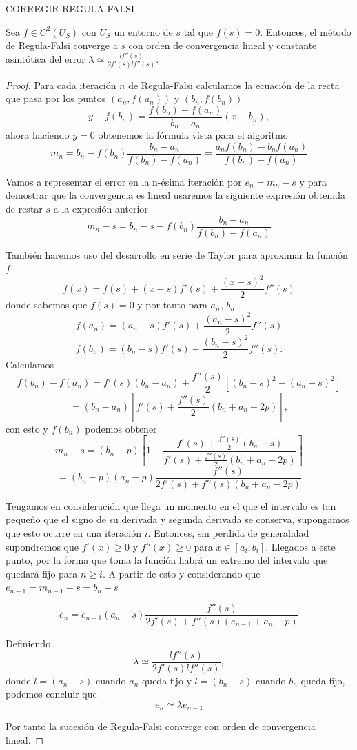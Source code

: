 CORREGIR REGULA-FALSI
\begin{teorema}
	Sea $f \in C^2(U_S)$ con $U_S$ un entorno de $s$ tal que $f(s) = 0$. Entonces, el método de Regula-Falsi converge a $s$ con orden de convergencia lineal y constante asintótica del error $\lambda \simeq \frac{l f''(s)}{2 f'(s) l f''(s)}$.
	
\end{teorema}

\begin{proof}
	Para cada iteración $n$ de Regula-Falsi calculamos la ecuación de la recta que pasa por los puntos $(a_n, f(a_n))$ y $(b_n, f(b_n))$
	\[
		y - f(b_n) = \frac{f(b_n) - f(a_n)}{b_n - a_n}(x - b_n),
	\]
	ahora haciendo $y = 0$ obtenemos la fórmula vista para el algoritmo
	\[
		m_n = b_n - f(b_n) \frac{b_n - a_n}{f(b_n) - f(a_n)} = \frac{a_n f(b_n) - b_n f(a_n)}{f(b_n) - f(a_n)}
	\]
	
	Vamos a representar el error en la n-ésima iteración por $e_n = m_n - s$ y para demostrar que la convergencia es lineal usaremos la siguiente expresión obtenida de restar $s$ a la expresión anterior
	\[
		m_n - s = b_n - s - f(b_n) \frac{b_n - a_n}{f(b_n) - f(a_n)}
	\]
	
	También haremos uso del desarrollo en serie de Taylor para aproximar la función $f$
	\[
		f(x) = f(s) + (x - s) f'(s) + \frac{(x - s)^2}{2} f''(s)
	\]
	donde sabemos que $f(s) = 0$ y por tanto para $a_n$, $b_n$
	\[
		f(a_n) = (a_n - s) f'(s) + \frac{(a_n - s)^2}{2} f''(s)
	\]
	\[
		f(b_n) = (b_n - s) f'(s) + \frac{(b_n - s)^2}{2} f''(s).
	\]
	Calculamos
	\[
		f(b_n) - f(a_n) = f'(s) (b_n - a_n) + \frac{f''(s)}{2}[(b_n - s)^2 - (a_n - s)^2]
	\]
	\[
		= (b_n - a_n) [f'(s) + \frac{f''(s)}{2} (b_n + a_n - 2p)],
	\]
	con esto y $f(b_n)$ podemos obtener
	\[
		m_n - s = (b_n - p)[1 - \frac{f'(s) + \frac{f''(s)}{2} (b_n - s)}{f'(s) + \frac{f''(s)}{2} (b_n + a_n - 2p)}]
	\]
	\[
		= (b_n - p) (a_n - p) \frac{f''(s)}{2 f'(s) + f''(s) (b_n + a_n - 2p)}
	\]
	
	Tengamos en consideración que llega un momento en el que el intervalo es tan pequeño que el signo de su derivada y segunda derivada se conserva, supongamos que esto ocurre en una iteración $i$. Entonces, sin perdida de generalidad supondremos que $f'(x) \geq 0$ y $f''(x) \geq 0$ para $x \in [a_i, b_i]$. Llegados a este punto, por la forma que toma la función habrá un extremo del intervalo que quedará fijo para $n \geq i$. A partir de esto y considerando que $e_{n-1} = m_{n-1} - s = b_n - s$
	
	\[
		e_n = e_{n-1} (a_n - s) \frac{f''(s)}{2 f'(s) + f''(s) (e_{n-1} + a_n - p)}
	\]
	
	Definiendo
	\[
		\lambda \simeq \frac{l f''(s)}{2 f'(s) l f''(s)},
	\]
	donde $l = (a_n - s)$ cuando $a_n$ queda fijo y $l = (b_n - s)$ cuando $b_n$ queda fijo, podemos concluir que
	\[
		e_n \simeq \lambda e_{n-1}
	\]
	
	Por tanto la sucesión de Regula-Falsi converge con orden de convergencia lineal.
\end{proof}


